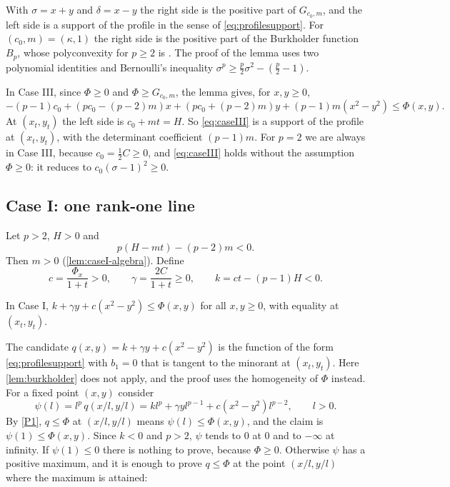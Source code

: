 With $\sigma=x+y$ and $\delta=x-y$ the right side is the positive part of $G_{c_0,m}$, and the
left side is a support of the profile in the sense of \eqref{eq:profilesupport}. For
$(c_0,m)=(\kappa,1)$ the right side is the positive part of the Burkholder function $B_p$, whose
polyconvexity for $p\ge2$ is \cite[Proposition~1.6]{GuerraKristensen2022}. The proof of the
lemma uses two polynomial identities and Bernoulli's inequality
$\sigma^p\ge\tfrac p2\sigma^2-(\tfrac p2-1)$.

In Case III, since $\Phi\ge0$ and $\Phi\ge G_{c_0,m}$, the lemma gives, for $x,y\ge0$,
\begin{equation}\label{eq:caseIII}
  -(p-1)c_0+(pc_0-(p-2)m)x+(pc_0+(p-2)m)y+(p-1)m(x^2-y^2)\le\Phi(x,y).
\end{equation}
At $(x_t,y_t)$ the left side is $c_0+mt=H$. So \eqref{eq:caseIII} is a support of the profile at
$(x_t,y_t)$, with the determinant coefficient $(p-1)m$. For $p=2$ we are always in Case III,
because $c_0=\tfrac12C\ge0$, and \eqref{eq:caseIII} holds without the assumption $\Phi\ge0$:
it reduces to $c_0(\sigma-1)^2\ge0$.

\subsection{Case I: one rank-one line}\label{sec:caseI}

Let $p>2$, $H>0$ and
\begin{equation}\label{eq:caseIhyp}
  p(H-mt)-(p-2)m<0 .
\end{equation}
Then $m>0$ (\cref{lem:caseI-algebra}). Define
\[
  c=\frac{\Phi_x}{1+t}>0,\qquad\gamma=\frac{2C}{1+t}\ge0,\qquad k=ct-(p-1)H<0 .
\]

\begin{proposition}\label{prop:caseI}
In Case I, $k+\gamma y+c(x^2-y^2)\le\Phi(x,y)$ for all $x,y\ge0$, with equality at
$(x_t,y_t)$.
\end{proposition}

The candidate $q(x,y)=k+\gamma y+c(x^2-y^2)$ is the function of the form
\eqref{eq:profilesupport} with $b_1=0$ that is tangent to the minorant at $(x_t,y_t)$. Here
\cref{lem:burkholder} does not apply, and the proof uses the homogeneity of $\Phi$ instead. For
a fixed point $(x,y)$ consider
\[
  \psi(l)=l^p\,q(x/l,y/l)=kl^p+\gamma yl^{p-1}+c(x^2-y^2)l^{p-2},\qquad l>0 .
\]
By \ref{P1}, $q\le\Phi$ at $(x/l,y/l)$ means $\psi(l)\le\Phi(x,y)$, and the claim is
$\psi(1)\le\Phi(x,y)$. Since $k<0$ and $p>2$, $\psi$ tends to $0$ at $0$ and to $-\infty$ at
infinity. If $\psi(1)\le0$ there is nothing to prove, because $\Phi\ge0$. Otherwise $\psi$ has a
positive maximum, and it is enough to prove $q\le\Phi$ at the point $(x/l,y/l)$ where the maximum
is attained:

